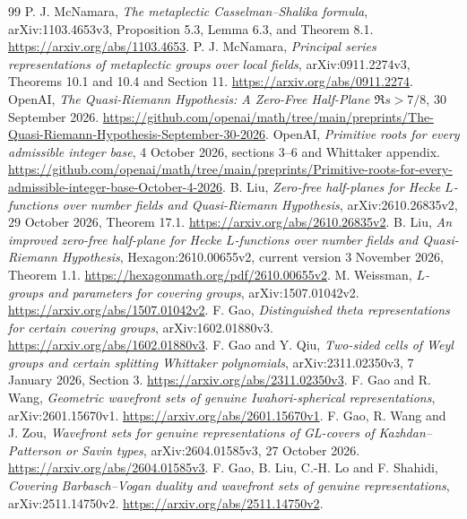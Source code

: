 \documentclass[11pt]{article}
\begin{document}






\begin{thebibliography}{99}
 P. J. McNamara, \emph{The metaplectic
Casselman--Shalika formula}, arXiv:1103.4653v3,
Proposition 5.3, Lemma 6.3, and Theorem 8.1.
\url{https://arxiv.org/abs/1103.4653}.
 P. J. McNamara, \emph{Principal series
representations of metaplectic groups over local fields},
arXiv:0911.2274v3, Theorems 10.1 and 10.4 and Section 11.
\url{https://arxiv.org/abs/0911.2274}.
 OpenAI, \emph{The Quasi-Riemann Hypothesis: A Zero-Free
Half-Plane $\Re s>7/8$}, 30 September 2026.
\url{https://github.com/openai/math/tree/main/preprints/The-Quasi-Riemann-Hypothesis-September-30-2026}.
 OpenAI, \emph{Primitive roots for every admissible
integer base}, 4 October 2026, sections 3--6 and Whittaker appendix.
\url{https://github.com/openai/math/tree/main/preprints/Primitive-roots-for-every-admissible-integer-base-October-4-2026}.
 B. Liu, \emph{Zero-free half-planes for Hecke
$L$-functions over number fields and Quasi-Riemann Hypothesis},
arXiv:2610.26835v2, 29 October 2026, Theorem 17.1.
\url{https://arxiv.org/abs/2610.26835v2}.
 B. Liu, \emph{An improved zero-free half-plane for Hecke
$L$-functions over number fields and Quasi-Riemann Hypothesis},
Hexagon:2610.00655v2, current version 3 November 2026, Theorem 1.1.
\url{https://hexagonmath.org/pdf/2610.00655v2}.
 M. Weissman, \emph{$L$-groups and parameters for
covering groups}, arXiv:1507.01042v2.
\url{https://arxiv.org/abs/1507.01042v2}.
 F. Gao, \emph{Distinguished theta representations for certain
covering groups}, arXiv:1602.01880v3.
\url{https://arxiv.org/abs/1602.01880v3}.
 F. Gao and Y. Qiu, \emph{Two-sided cells of Weyl groups
and certain splitting Whittaker polynomials}, arXiv:2311.02350v3,
7 January 2026, Section 3.
\url{https://arxiv.org/abs/2311.02350v3}.
 F. Gao and R. Wang, \emph{Geometric wavefront
sets of genuine Iwahori-spherical representations}, arXiv:2601.15670v1.
\url{https://arxiv.org/abs/2601.15670v1}.
 F. Gao, R. Wang and J. Zou,
\emph{Wavefront sets for genuine representations of GL-covers of
Kazhdan--Patterson or Savin types}, arXiv:2604.01585v3,
27 October 2026.
\url{https://arxiv.org/abs/2604.01585v3}.
 F. Gao, B. Liu, C.-H. Lo and F. Shahidi,
\emph{Covering Barbasch--Vogan duality and wavefront sets of genuine
representations}, arXiv:2511.14750v2.
\url{https://arxiv.org/abs/2511.14750v2}.


\end{thebibliography}
\end{document}
